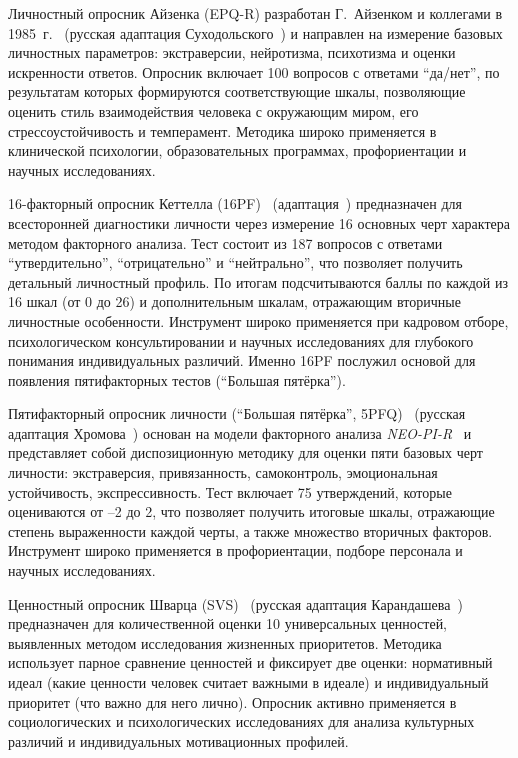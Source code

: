 Личностный опросник Айзенка (EPQ-R) разработан Г.~Айзенком и коллегами в 1985~г.~\cite{Eysenck} (русская адаптация Суходольского~\cite{Sukhodolsky}) и направлен на измерение базовых личностных параметров: экстраверсии, нейротизма, психотизма и оценки искренности ответов. Опросник включает 100 вопросов с ответами \enquote{да/нет}, по результатам которых формируются соответствующие шкалы, позволяющие оценить стиль взаимодействия человека с окружающим миром, его стрес\-со\-ус\-той\-чивость и темперамент. Методика широко применяется в клинической психологии, образовательных программах, профориентации и научных исследованиях.

16-факторный опросник Кеттелла (16PF)~\cite{Cattell} (адаптация~\cite{Shmelev}) предназначен для всесторонней диагностики личности через измерение 16 основных черт характера методом факторного анализа. Тест состоит из 187 вопросов с ответами \enquote{утвердительно}, \enquote{отрицательно} и \enquote{нейтрально}, что позволяет получить детальный личностный профиль. По итогам подсчитываются баллы по каждой из 16 шкал (от 0 до 26) и дополнительным шкалам, отражающим вторичные личностные особенности. Инструмент широко применяется при кадровом отборе, психологическом консультировании и научных исследованиях для глубокого понимания индивидуальных различий. Именно 16PF послужил основой для появления пятифакторных тестов (\enquote{Большая пятёрка}).

Пятифакторный опросник личности (\enquote{Большая пятёрка}, 5PFQ)~\cite{Tsuji} (русская адаптация Хромова~\cite{Khromov}) основан на модели факторного анализа \textit{NEO-PI-R}~\cite{Costa} и представляет собой диспозиционную методику для оценки пяти базовых черт личности: экстраверсия, привязанность, самоконтроль, эмоциональная устойчивость, экспрессивность. Тест включает 75 утверждений, которые оцениваются от –2 до 2, что позволяет получить итоговые шкалы, отражающие степень выраженности каждой черты, а также множество вторичных факторов. Инструмент широко применяется в профориентации, подборе персонала и научных исследованиях.

Ценностный опросник Шварца (SVS)~\cite{Schwartz} (русская адаптация Карандашева~\cite{Karandashev}) предназначен для количественной оценки 10 универсальных ценностей, выявленных методом исследования жизненных приоритетов. Методика использует парное сравнение ценностей и фиксирует две оценки: нормативный идеал (какие ценности человек считает важными в идеале) и индивидуальный приоритет (что важно для него лично). Опросник активно применяется в социологических и психологических исследованиях для анализа культурных различий и индивидуальных мотивационных профилей.


